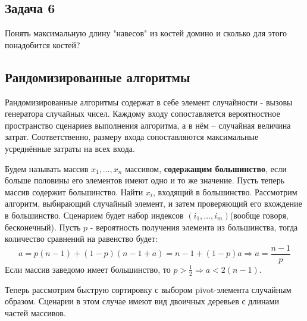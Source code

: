 \documentclass[11pt]{article}
\begin{document}
\subsection{Задача 6}
\label{sec:orgc3fbf54}
Понять максимальную длину "навесов" из костей домино и сколько для этого понадобится костей?
\subsection{Рандомизированные алгоритмы}
\label{sec:org2de9343}
Рандомизированные алгоритмы содержат в себе элемент случайности - вызовы генератора случайных
чисел. Каждому входу сопоставляется вероятностное пространство сценариев выполнения алгоритма,
а в нём -- случайная величина затрат. Соответственно, размеру входа сопоставляются максимальные
усреднённые затраты на всех входа.

Будем называть массив \(x_1, \ldots, x_n\) массивом, \textbf{содержащим большинство}, если больше
половины его элементов имеют одно и то же значение. Пусть теперь массив содержит большинство.
Найти \(x_i\), входящий в большинство. Рассмотрим алгоритм, выбирающий случайный элемент, и
затем проверяющий его вхождение в большинство. Сценарием будет набор индексов
\((i_1, \ldots, i_m)\)(вообще говоря, бесконечный). Пусть \(p\) - вероятность получения элемента
из большинства, тогда количество сравнений на равенство будет:
\begin{equation}
a = p(n - 1) + (1 - p)(n - 1 + a) = n - 1 + (1 - p)a \Rightarrow a = \frac{n - 1}{p}
\end{equation}
Если массив заведомо имеет большинство, то $p > \frac12 \Rightarrow a < 2(n - 1)$.

Теперь рассмотрим быструю сортировку с выбором pivot-элемента случайным образом. Сценарии в
этом случае имеют вид двоичных деревьев с длинами частей массивов.
\end{document}
